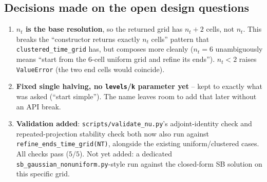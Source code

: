 \documentclass[11pt]{article}
\newcommand{\code}[1]{\texttt{#1}}
\begin{document}
\subsection*{Decisions made on the open design questions}
\begin{enumerate}
  \item \textbf{$n_t$ is the base resolution}, so the returned grid has $n_t+2$ cells,
        not $n_t$. This breaks the ``constructor returns exactly $n_t$ cells'' pattern
        that \code{clustered\_time\_grid} has, but composes more cleanly ($n_t=6$
        unambiguously means ``start from the $6$-cell uniform grid and refine its
        ends''). $n_t < 2$ raises \code{ValueError} (the two end cells would coincide).
  \item \textbf{Fixed single halving, no \code{levels}/\code{k} parameter yet} -- kept to
        exactly what was asked (``start simple''). The name leaves room to add that
        later without an API break.
  \item \textbf{Validation added}: \code{scripts/validate\_nu.py}'s adjoint-identity
        check and repeated-projection stability check both now also run against
        \code{refine\_ends\_time\_grid(NT)}, alongside the existing uniform/clustered
        cases. All checks pass ($5/5$). Not yet added: a dedicated
        \code{sb\_gaussian\_nonuniform.py}-style run against the closed-form SB solution
        on this specific grid.
\end{enumerate}
\end{document}
